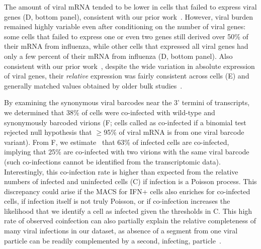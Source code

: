 \documentclass[9pt,lineno]{elife}
\begin{document}
The amount of viral mRNA tended to be lower in cells that failed to express viral genes (D, bottom panel), consistent with our prior work~\citep{russell2018extreme}.
However, viral burden remained highly variable even after conditioning on the number of viral genes: some cells that failed to express one or even two genes still derived over 50\% of their mRNA from influenza, while other cells that expressed all viral genes had only a few percent of their mRNA from influenza (D, bottom panel).
Also consistent with our prior work~\citep{russell2018extreme}, despite the wide variation in absolute expression of viral genes, their \emph{relative} expression was fairly consistent across cells (E) and generally matched values obtained by older bulk studies~\citep{hatada1989control}.

By examining the synonymous viral barcodes near the 3' termini of transcripts, we determined that 38\% of cells were co-infected with wild-type and synonymously barcoded virions (F; cells called as co-infected if a binomial test rejected null hypothesis that $\ge$95\% of viral mRNA is from one viral barcode variant).
From F, we estimate~\citep{bloom2018estimating} that 63\% of infected cells are co-infected, implying that 25\% are co-infected with two virions with the same viral barcode (such co-infections cannot be identified from the transcriptomic data).
Interestingly, this co-infection rate is higher than expected from the relative numbers of infected and uninfected cells (C) if infection is a Poisson process.
This discrepancy could arise if the MACS for IFN+ cells also enriches for co-infected cells, if infection itself is not truly Poisson, or if co-infection increases the likelihood that we identify a cell as infected given the thresholds in C.
This high rate of observed coinfection can also partially explain the relative completeness of many viral infections in our dataset, as absence of a segment from one viral particle can be readily complemented by a second, infecting, particle~\citep{russell2018extreme}. 
\end{document}
